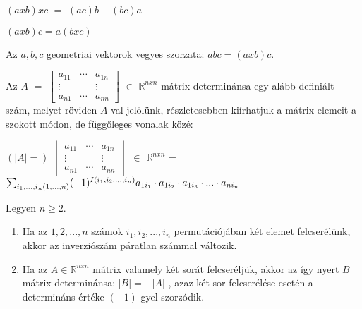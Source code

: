 	\begin{frame}
		\begin{tcolorbox}[title={Tétel.: Kifejtési tétel}]
			$(a x b) x c$ $=$ $(ac)b - (bc)a$
		\end{tcolorbox}	
		
		\begin{tcolorbox}[title={Tétel.: Felcserélési tétel}]
			$(a x b)c = a(b x c)$
		\end{tcolorbox}	
		
		\begin{tcolorbox}[title={Def.: Vegyesszorzat}]
			Az $a, b, c$ geometriai vektorok vegyes szorzata: $abc = (a x b)c$.
		\end{tcolorbox}	
		
		\begin{tcolorbox}[title={Def.: Determináns}]
			Az $A$ $=$ $\begin{bmatrix} 
  				a_{11} & \cdots & a_{1n}  \\
  				\vdots &   & \vdots \\
  				a_{n1} & \cdots & a_{nn}
			\end{bmatrix}$ $\in$ $\mathbb{R}^{n x n}$ mátrix determinánsa egy alább definiált szám, melyet röviden $A$-val jelölünk, részletesebben kiírhatjuk a mátrix elemeit a szokott módon, de függőleges vonalak közé:\\
			\mmedskip
			
			$(|A| = )$ $\begin{vmatrix} 
  				a_{11} & \cdots & a_{1n} \\
  				\vdots &   & \vdots\\
  				a_{n1} & \cdots & a_{nn}
			\end{vmatrix}$ $\in$ $\mathbb{R}^{n x n}$ = $\sum_{i_1, ..., i_n\\ (1, ..., n)} (-1)^{I(i_1, i_2, ..., i_n)} a_{1i_1} \cdot a_{1i_2} \cdot a_{1i_3} \cdot ... \cdot a_{ni_n}$
		\end{tcolorbox}	
		
		\begin{tcolorbox}[title={Tétel.: Determináns elem, és sorcsere}]
			Legyen $n \geq 2$.\\
			
			\begin{enumerate}
    				\item Ha az $1, 2, ..., n$ számok $i_1, i_2, ..., i_n$ permutációjában két elemet felcserélünk, akkor az inverziószám páratlan számmal változik.
    				\item Ha az $A \in \mathbb{R}^{n x n}$ mátrix valamely két sorát felcseréljük, akkor az így nyert $B$ mátrix determinánsa: $|B| = -|A|$ , azaz két sor felcserélése esetén a determináns értéke $(- 1)$-gyel szorzódik.
			\end{enumerate}
		\end{tcolorbox}	
	\end{frame}
	
